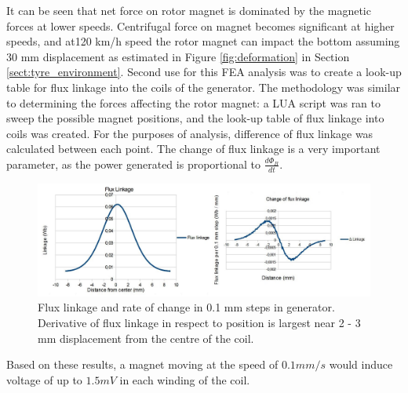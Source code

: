 It can be seen that net force on rotor magnet is dominated by the magnetic forces at lower speeds. Centrifugal force on magnet becomes significant at higher speeds, and at120 km/h speed the rotor magnet can impact the bottom assuming 30 mm displacement as estimated in Figure \ref{fig:deformation} in Section \ref{sect:tyre_environment}. Second use for this FEA analysis was to create a look-up table for flux linkage into the coils of the generator. The methodology was similar to determining the forces affecting the rotor magnet: a LUA script was ran to sweep the possible magnet positions, and the look-up table of flux linkage into coils was created. For the purposes of analysis, difference of flux linkage was calculated between each point. The change of flux linkage is a very important parameter, as the power generated is proportional to $\frac{d \Phi_{B}}{d t}$. 

\begin{figure}[htb]
\begin{center}
\includegraphics[width=\columnwidth]{images/own_dwg/femm_flux_dualmagnet.jpg}
\end{center}
\caption{\label{fig:femm_linkage} Flux linkage and rate of change in 0.1 mm steps in generator. Derivative of flux linkage in respect to position is largest near 2 - 3 mm displacement from the centre of the coil.}
\end{figure}

Based on these results, a magnet moving at the speed of $0.1 mm / s $ would induce voltage of up to $1.5 mV$ in each winding of the coil.

